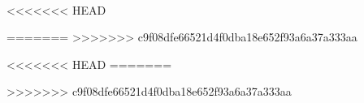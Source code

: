 \documentclass[a4paper,11pt]{book}
\makeatletter
\def\clearpage{%
  \ifvmode
    \ifnum \@dbltopnum =\m@ne
      \ifdim \pagetotal <\topskip
        \hbox{}
      \fi
    \fi
  \fi
  \newpage
  \thispagestyle{empty}
  \write\m@ne{}
  \vbox{}
  \penalty -\@Mi
}
\makeatother
\begin{document}
 
 \frontmatter
 

 \begingroup
 \let\cleardoublepage\clearpage
  \tableofcontents
  \listoffigures
  \listoftables
  \lstlistoflistings
 \endgroup


 \thispagestyle{empty}
 \
 \mainmatter






<<<<<<< HEAD









 


\appendix










=======
>>>>>>> c9f08dfe66521d4f0dba18e652f93a6a37a333aa


\thispagestyle{empty}

<<<<<<< HEAD
=======
\newpage
%
%
%

>>>>>>> c9f08dfe66521d4f0dba18e652f93a6a37a333aa
\end{document}
